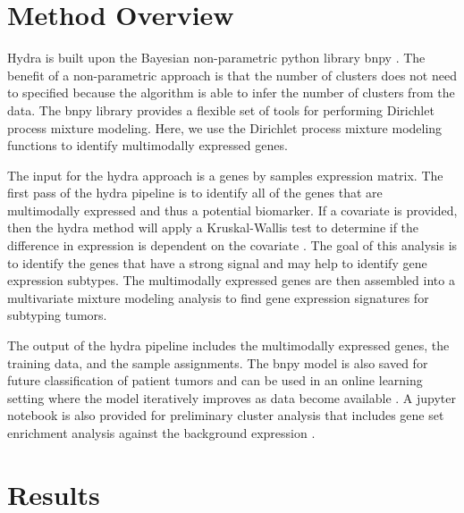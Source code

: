 \documentclass[fleqn,10pt]{wlscirep}
\begin{document}
\section*{Method Overview}

Hydra is built upon the Bayesian non-parametric python library bnpy \cite{hughes2014bnpy}. The benefit of a non-parametric approach is that the number of clusters does not need to specified because the algorithm is able to infer the number of clusters from the data. The bnpy library provides a flexible set of tools for performing Dirichlet process mixture modeling. Here, we use the Dirichlet process mixture modeling functions to identify multimodally expressed genes.

The input for the hydra approach is a genes by samples expression matrix. The first pass of the hydra pipeline is to identify all of the genes that are multimodally expressed and thus a potential biomarker. If a covariate is provided, then the hydra method will apply a Kruskal-Wallis test to determine if the difference in expression is dependent on the covariate \cite{mckight2010kruskal}. The goal of this analysis is to identify the genes that have a strong signal and may help to identify gene expression subtypes. The multimodally expressed genes are then assembled into a multivariate mixture modeling analysis to find gene expression signatures for subtyping tumors.

The output of the hydra pipeline includes the multimodally expressed genes, the training data, and the sample assignments. The bnpy model is also saved for future classification of patient tumors and can be used in an online learning setting where the model iteratively improves as data become available \cite{robert2014machine}. A jupyter notebook is also provided for preliminary cluster analysis that includes gene set enrichment analysis against the background expression \cite{kluyver2016jupyter,sergushichev2016algorithm}.

\section*{Results}
\end{document}
